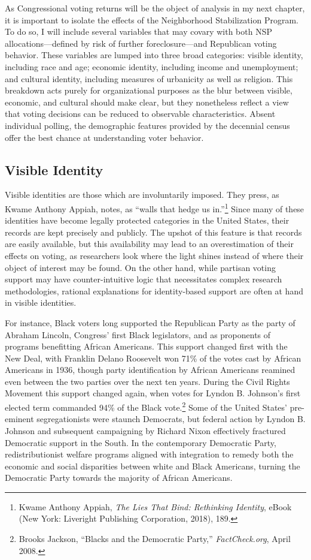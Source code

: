 \documentclass[12pt,oneside]{psthesis}
\begin{document}
As Congressional voting returns will be the object of analysis in my next chapter, it is important to isolate the effects of the Neighborhood Stabilization Program.
To do so, I will include several variables that may covary with both NSP allocations---defined by risk of further foreclosure---and Republican voting behavior.
These variables are lumped into three broad categories: visible identity, including race and age; economic identity, including income and unemployment; and cultural identity, including measures of urbanicity as well as religion.
This breakdown acts purely for organizational purposes as the blur between visible, economic, and cultural should make clear, but they nonetheless reflect a view that voting decisions can be reduced to observable characteristics.
Absent individual polling, the demographic features provided by the decennial census offer the best chance at understanding voter behavior.

\hypertarget{visible-identity}{%
\subsection{Visible Identity}\label{visible-identity}}

Visible identities are those which are involuntarily imposed.
They press, as Kwame Anthony Appiah, notes, as ``walls that hedge us in.''\footnote{Kwame Anthony Appiah, \emph{The Lies That Bind: Rethinking Identity}, eBook (New York: Liveright Publishing Corporation, 2018), 189.}
Since many of these identities have become legally protected categories in the United States, their records are kept precisely and publicly.
The upshot of this feature is that records are easily available, but this availability may lead to an overestimation of their effects on voting, as researchers look where the light shines instead of where their object of interest may be found.
On the other hand, while partisan voting support may have counter-intuitive logic that necessitates complex research methodologies, rational explanations for identity-based support are often at hand in visible identities.

For instance, Black voters long supported the Republican Party as the party of Abraham Lincoln, Congress' first Black legislators, and as proponents of programs benefitting African Americans.
This support changed first with the New Deal, with Franklin Delano Roosevelt won 71\% of the votes cast by African Americans in 1936, though party identification by African Americans reamined even between the two parties over the next ten years.
During the Civil Rights Movement this support changed again, when votes for Lyndon B. Johnson's first elected term commanded 94\% of the Black vote.\footnote{Brooks Jackson, ``Blacks and the Democratic Party,'' \emph{FactCheck.org}, April 2008.}
Some of the United States' pre-eminent segregationists were staunch Democrats, but federal action by Lyndon B. Johnson and subsequent campaigning by Richard Nixon effectively fractured Democratic support in the South.
In the contemporary Democratic Party, redistributionist welfare programs aligned with integration to remedy both the economic and social disparities between white and Black Americans, turning the Democratic Party towards the majority of African Americans.
\end{document}
